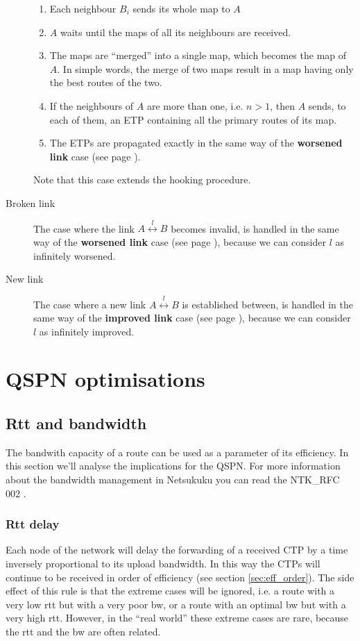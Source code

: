 \documentclass[a4paper]{article}
\begin{document}
\begin{description}
\begin{enumerate}
			\item Each neighbour $B_i$ sends its whole map to
				$A$
			\item $A$ waits until the maps of all its neighbours
				are received.
			\item The maps are ``merged'' into a single map, which
				becomes the map of $A$. In simple words, the
				merge of two maps result in a map having only the
				best routes of the two.
			\item If the neighbours of $A$ are more than one, i.e.
				$n>1$, then $A$ sends, to each of them, an ETP
				containing all the primary routes of its map.
			\item The ETPs are propagated exactly in the same way
				of the \textbf{worsened link} case (see page
				\pageref{wlink}).
		\end{enumerate}
		Note that this case extends the hooking procedure.
	\item[Broken link] 
		The case where the link $A
		\stackrel{l}{\leftrightarrow} B$ becomes invalid, is handled
		in the same way of the \textbf{worsened link} case (see
		page \pageref{wlink}), because we can consider $l$ as
		infinitely worsened.
	\item[New link]
		The case where a new link $A \stackrel{l}{\leftrightarrow} B$
		is established between, is handled  in the same way of the
		\textbf{improved link} case (see page \pageref{ilink}),
		because we can consider $l$ as infinitely improved.
\end{description}


\section{QSPN optimisations}
\subsection{Rtt and bandwidth}
\label{sec:bandwidth_q1q2}

The bandwith capacity of a route can be used as a parameter of its
efficiency. In this section we'll analyse the implications for the QSPN.
For more information about the bandwidth management in Netsukuku you can read
the NTK\_RFC 002 \cite{ntkrfc0002}.

\subsubsection{Rtt delay}
\label{sec:rtt_delay}

Each node of the network will delay the forwarding of a received CTP by a time
inversely proportional to its upload bandwidth. In this way the CTPs will
continue to be received in order of efficiency (see section
\ref{sec:eff_order}).
The side effect of this rule is that the extreme cases will be ignored, i.e. a
route with a very low rtt but with a very poor bw, or a route with an optimal
bw but with a very high rtt. However, in the ``real world'' these extreme
cases are rare, because the rtt and the bw are often related.
\end{document}
